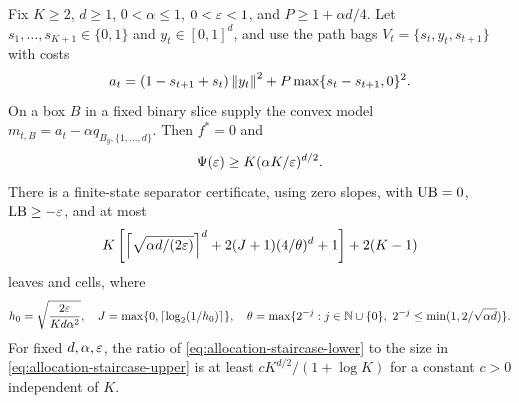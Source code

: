 \begin{proposition}
\label{prop:allocation-staircase}
Fix $K\ge2$, $d\ge1$, $0<\alpha\le1$, $0<\varepsilon<1$, and
$P\ge1+\alpha d/4$. Let $s_1,\ldots,s_{K+1}\in\{0,1\}$ and
$y_t\in[0,1]^d$, and use the path bags
$V_t=\{s_t,y_t,s_{t+1}\}$ with costs
\[
 a_t=(1-s_{t+1}+s_t)\left\lVert y_t\right\rVert^2+
       P\max\{s_t-s_{t+1},0\}^2.
\]
On a box $B$ in a fixed binary slice supply the convex model
$m_{t,B}=a_t-\alpha q_{B_y,\{1,\ldots,d\}}$.
Then $f^*=0$ and
\begin{equation}\label{eq:allocation-staircase-lower}
 \Psi(\varepsilon)\ge K(\alpha K/\varepsilon)^{d/2}.
\end{equation}
There is a finite-state separator certificate, using zero slopes, with
$\mathrm{UB}=0$, $\mathrm{LB}\ge-\varepsilon$, and at most
\begin{equation}\label{eq:allocation-staircase-upper}
 K\left[\left\lceil \sqrt{\alpha d/(2\varepsilon)}\right\rceil^d+
 2(J+1)(4/\theta)^d+1\right]+2(K-1)
\end{equation}
leaves and cells, where
\[
 h_0=\sqrt{\frac{2\varepsilon}{K d\alpha^2}},\quad
 J=\max\{0,\left\lceil \log_2(1/h_0)\right\rceil\},\quad
 \theta=\max\{2^{-j}:j\in\mathbb N\cup\{0\},\
                 2^{-j}\le\min(1,2/\sqrt{\alpha d})\}.
\]
For fixed $d,\alpha,\varepsilon$, the ratio of \eqref{eq:allocation-staircase-lower}
to the size in \eqref{eq:allocation-staircase-upper} is at least
$cK^{d/2}/(1+\log K)$ for a constant $c>0$ independent of $K$.
\end{proposition}
